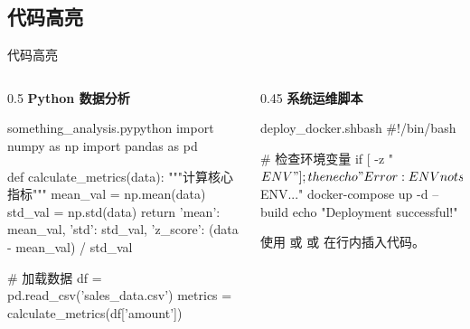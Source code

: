 \subsection{代码高亮}
\begin{frame}[fragile]{代码高亮}
  \begin{columns}[T]
    \begin{column}{0.5\textwidth}
      \textbf{\color{main} Python 数据分析}
      \begin{iCodeEnv}{something\_analysis.py}{python}
        import numpy as np
        import pandas as pd

        def calculate_metrics(data):
        """计算核心指标"""
        mean_val = np.mean(data)
        std_val = np.std(data)
        return {
          'mean': mean_val,
          'std': std_val,
          'z_score': (data - mean_val) / std_val
        }

        # 加载数据
        df = pd.read_csv('sales_data.csv')
        metrics = calculate_metrics(df['amount'])
      \end{iCodeEnv}
    \end{column}
    \begin{column}{0.45\textwidth}
      \textbf{\color{main} 系统运维脚本}
      \begin{iCodeEnv}{deploy\_docker.sh}{bash}
        #!/bin/bash

        # 检查环境变量
        if [ -z "$ENV" ]; then
        echo "Error: ENV not set"
        exit 1
        fi

        echo "Deploying to $ENV..."
        docker-compose up -d --build
        echo "Deployment successful!"
      \end{iCodeEnv}
      \vspace{0.5em}
      \small
      使用  或  或
       在行内插入代码。
    \end{column}
  \end{columns}
\end{frame}

